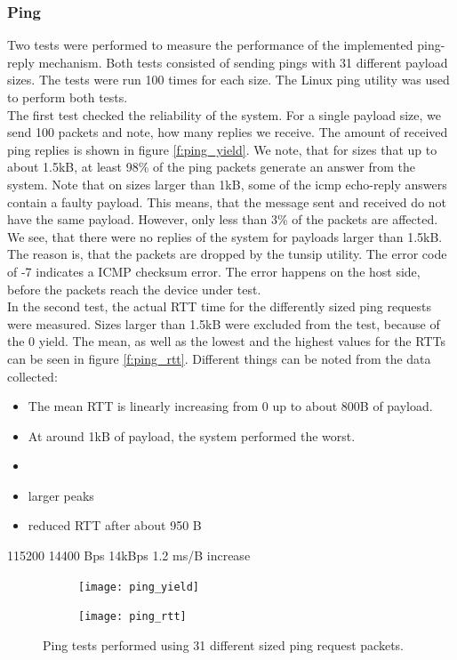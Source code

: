 \subsubsection{Ping}
Two tests were performed to measure the performance of the implemented ping-reply mechanism. Both tests consisted of sending pings with 31 different payload sizes. The tests were run 100 times for each size. The Linux ping utility was used to perform both tests.\\
The first test checked the reliability of the system. For a single payload size, we send 100 packets and note, how many replies we receive. The amount of received ping replies is shown in figure \ref{f:ping_yield}. We note, that for sizes that up to about 1.5kB, at least 98\% of the ping packets generate an answer from the system. Note that on sizes larger than 1kB, some of the icmp echo-reply answers contain a faulty payload. This means, that the message sent and received do not have the same payload. However, only less than 3\% of the packets are affected. We see, that there were no replies of the system for payloads larger than 1.5kB. The reason is, that the packets are dropped by the tunsip utility. The error code of -7 indicates a ICMP checksum error. The error happens on the host side, before the packets reach the device under test.\\
In the second test, the actual RTT time for the differently sized ping requests were measured. Sizes larger than 1.5kB were excluded from the test, because of the 0 yield. The mean, as well as the lowest and the highest values for the RTTs can be seen in figure \ref{f:ping_rtt}. Different things can be noted from the data collected: 
\begin{itemize}
	\item The mean RTT is linearly increasing from 0 up to about 800B of payload. 
	\item At around 1kB of payload, the system performed the worst. 
	\item {}
	\item larger peaks
	\item reduced RTT after about 950 B
\end{itemize}

115200
14400 Bps
14kBps
1.2 ms/B increase

\begin{figure}
	\begin{subfigure}[c]{0.50\textwidth}
	\centering
		\texttt{[image: ping\_yield]}
	\end{subfigure}
\begin{subfigure}[c]{0.50\textwidth}
\centering
		\texttt{[image: ping\_rtt]}
	\end{subfigure}
	\caption{Ping tests performed using 31 different sized ping request packets.}
	\label{f:ping_figure}
\end{figure}

